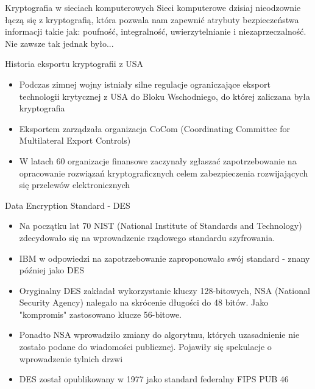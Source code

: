 \documentclass[aspectratio=169]{beamer}
\begin{document}
\begin{frame}{Kryptografia w sieciach komputerowych}
  Sieci komputerowe dzisiaj nieodzownie łączą się z kryptografią, która pozwala nam zapewnić atrybuty bezpieczeństwa informacji takie jak: poufność, integralność, uwierzytelnianie i niezaprzeczalność. Nie zawsze tak jednak było... 
\end{frame}

\begin{frame}{Historia eksportu kryptografii z USA}
  \begin{itemize}
      \item Podczas zimnej wojny istniały silne regulacje ograniczające eksport technologii krytycznej z USA do Bloku Wschodniego, do której zaliczana była kryptografia
      \item Eksportem zarządzała organizacja CoCom (Coordinating Committee for Multilateral Export Controls)
      \item W latach 60 organizacje finansowe zaczynały zgłaszać zapotrzebowanie na opracowanie rozwiązań kryptograficznych celem zabezpieczenia rozwijających się przelewów elektronicznych
  \end{itemize}
\end{frame}

\begin{frame}{Data Encryption Standard - DES}
    \begin{itemize}
      \item Na początku lat 70 NIST (National Institute of Standards and Technology) zdecydowało się na wprowadzenie rządowego standardu szyfrowania.
      \item IBM w odpowiedzi na zapotrzebowanie zaproponowało swój standard - znany później jako DES
      \item Oryginalny DES zakładał wykorzystanie kluczy 128-bitowych, NSA (National Security Agency) nalegało na skrócenie długości do 48 bitów. Jako "kompromis" zastosowano klucze 56-bitowe.
      \item Ponadto NSA wprowadziło zmiany do algorytmu, których uzasadnienie nie zostało podane do wiadomości publicznej. Pojawiły się spekulacje o wprowadzenie tylnich drzwi
      \item DES został opublikowany w 1977 jako standard federalny FIPS PUB 46
    \end{itemize}
\end{frame}
\end{document}
